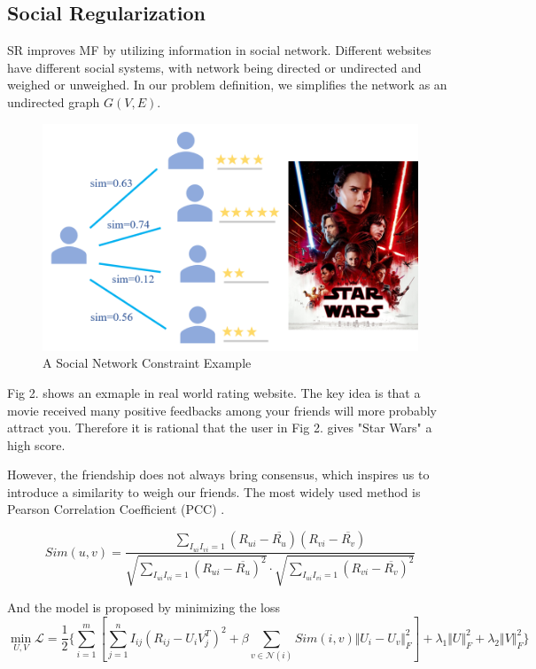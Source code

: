 \documentclass{article}
\begin{document}
\subsection{Social Regularization}
SR improves MF by utilizing information in social network. Different websites 
have different social systems, with network being directed or undirected and weighed 
or unweighed. In our problem definition, we simplifies the network as an undirected graph $G(V, E)$. 

\begin{figure}[h]
  \centering
  \includegraphics[scale=0.35]{pic/figure2.png}
  \caption{A Social Network Constraint Example}
\end{figure}

Fig 2. shows an exmaple in real world rating website. The key idea is that a movie 
received many positive feedbacks among your friends will more probably attract you. 
Therefore it is rational that the user in Fig 2. gives "Star Wars" a high score. 

However, the friendship does not always bring consensus, which inspires us to introduce 
a similarity to weigh our friends. The most widely used method is 
Pearson Correlation Coefficient (PCC) \cite{bre1998pcc}.

\begin{equation}
  {Sim}(u, v) = \frac{\sum_{I_{ui} I_{vi} = 1} (R_{ui} - \overline{R_u}) (R_{vi} - \overline{R_v}) }
  {\sqrt{\sum_{I_{ui} I_{vi} = 1} (R_{ui} - \overline{R_u})^2} \cdot \sqrt{\sum_{I_{ui} I_{vi} = 1} (R_{vi} - \overline{R_v})^2}}
\end{equation}

And the model is proposed by minimizing the loss
\begin{equation}
  \min_{U, V} \mathcal{L} = \frac{1}{2} \{\sum_{i=1}^m [\sum_{j=1}^n I_{ij} (R_{ij} - U_iV_j^T)^2 + \beta \sum_{v \in \mathcal{N}(i)} {Sim}(i, v) \Vert U_i - U_v \Vert_F^2 ] + \lambda_1 \Vert U \Vert_F^2 + \lambda_2 \Vert V \Vert_F^2 \}
\end{equation}
\end{document}

